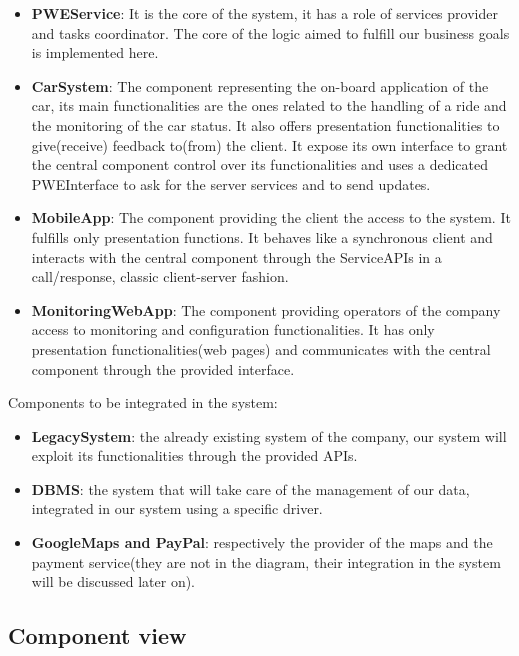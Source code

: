 \documentclass[]{article}
\providecommand{\tightlist}{%
  \setlength{\itemsep}{0pt}\setlength{\parskip}{0pt}}
\begin{document}
\begin{itemize}
\tightlist
\item
  \textbf{PWEService}: It is the core of the system, it has a role of
  services provider and tasks coordinator. The core of the logic aimed
  to fulfill our business goals is implemented here.
\item
  \textbf{CarSystem}: The component representing the on-board
  application of the car, its main functionalities are the ones related
  to the handling of a ride and the monitoring of the car status. It
  also offers presentation functionalities to give(receive) feedback
  to(from) the client. It expose its own interface to grant the central
  component control over its functionalities and uses a dedicated
  PWEInterface to ask for the server services and to send updates.
\item
  \textbf{MobileApp}: The component providing the client the access to
  the system. It fulfills only presentation functions. It behaves like a
  synchronous client and interacts with the central component through
  the ServiceAPIs in a call/response, classic client-server fashion.
\item
  \textbf{MonitoringWebApp}: The component providing operators of the
  company access to monitoring and configuration functionalities. It has
  only presentation functionalities(web pages) and communicates with the
  central component through the provided interface.
\end{itemize}

Components to be integrated in the system:

\begin{itemize}
\tightlist
\item
  \textbf{LegacySystem}: the already existing system of the company, our
  system will exploit its functionalities through the provided APIs.
\item
  \textbf{DBMS}: the system that will take care of the management of our
  data, integrated in our system using a specific driver.
\item
  \textbf{GoogleMaps and PayPal}: respectively the provider of the maps
  and the payment service(they are not in the diagram, their integration
  in the system will be discussed later on).
\end{itemize}

\subsection{Component view}\label{component-view}
\end{document}
